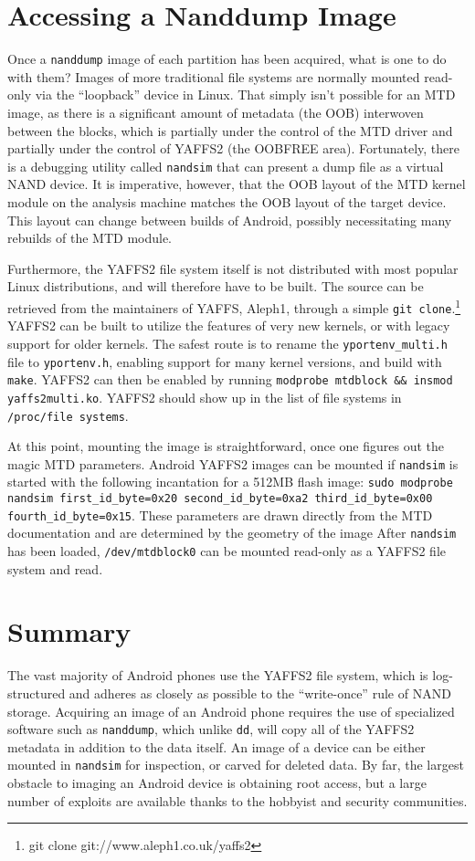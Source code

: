 \section{Accessing a Nanddump Image}

Once a \texttt{nanddump} image of each partition has been acquired, what is one to do with them?  Images of more traditional
file systems are normally mounted read-only via the ``loopback'' device in Linux.  That simply isn't possible for an MTD image, as
there is a significant amount of metadata (the OOB) interwoven between the blocks, which is partially under the control of the MTD
driver and partially under the control of YAFFS2 (the OOBFREE area).  Fortunately, there is a debugging utility called
\texttt{nandsim} that can present a dump file as a virtual NAND device. It is imperative, however, that the OOB layout of the MTD
kernel module on the analysis machine matches the OOB layout of the target device.  This layout can change between builds of Android,
possibly necessitating many rebuilds of the MTD module. 

Furthermore, the YAFFS2 file system itself is not distributed with most popular Linux distributions, and will therefore have to be built.
The source can be retrieved from the maintainers of YAFFS, Aleph1, through a simple \texttt{git clone}.\footnote{git clone git://www.aleph1.co.uk/yaffs2} YAFFS2 can be built to utilize the features of very new kernels, or with legacy support for older kernels. 
The safest route is to rename the \texttt{yportenv\_multi.h} file to \texttt{yportenv.h}, enabling support for many kernel versions, and build with \texttt{make}. 
YAFFS2 can then be enabled by running \texttt{modprobe mtdblock \&\& insmod yaffs2multi.ko}. 
YAFFS2 should show up in the list of file systems in \texttt{/proc/file systems}.

At this point, mounting the image is straightforward, once one figures out the magic MTD parameters.
Android YAFFS2 images can be mounted if \texttt{nandsim} is started with the following incantation for a 512MB flash image:
\texttt{sudo modprobe nandsim first\_id\_byte=0x20 second\_id\_byte=0xa2 third\_id\_byte=0x00 fourth\_id\_byte=0x15}.
These parameters are drawn directly from the MTD documentation and are determined by the geometry of the image \cite{mtdfaq}
After \texttt{nandsim} has been loaded, \texttt{/dev/mtdblock0} can be mounted read-only as a YAFFS2 file system and read.

\section{Summary}

The vast majority of Android phones use the YAFFS2 file system, which is log-structured and adheres as closely as possible to the
``write-once'' rule of NAND storage. Acquiring an image of an Android phone requires the use of specialized software such as
\texttt{nanddump}, which unlike \texttt{dd}, will copy all of the YAFFS2 metadata in addition to the data itself. An image of a
device can be either mounted in \texttt{nandsim} for inspection, or carved for deleted data. By far, the largest obstacle to imaging
an Android device is obtaining root access, but a large number of exploits are available thanks to the hobbyist and security
communities.
